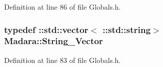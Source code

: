 Definition at line 86 of file Globals.h.

\hypertarget{namespaceMadara_a5555eaae3fdb02fcc2691b8ff0178e1c}{
\subsubsection[{String\_\-Vector}]{\setlength{\rightskip}{0pt plus 5cm}typedef ::std::vector$<$ ::std::string$>$ {\bf Madara::String\_\-Vector}}}
\label{d8/da1/namespaceMadara_a5555eaae3fdb02fcc2691b8ff0178e1c}


Definition at line 83 of file Globals.h.

